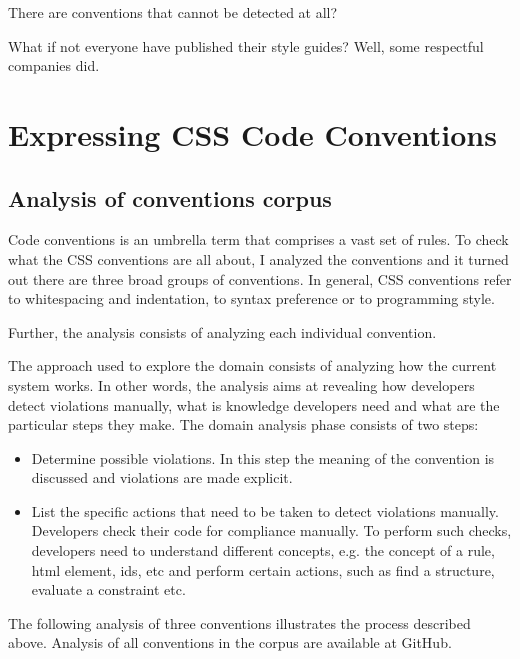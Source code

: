\documentclass[parskip=full]{uvamscse}
\begin{document}
There are conventions that cannot be detected at all?

What if not everyone have published their style guides? Well, some respectful companies did.


\chapter{Expressing CSS Code Conventions}

\section{Analysis of conventions corpus}

Code conventions is an umbrella term that comprises a vast set of rules. To check what the CSS
conventions are all about, I analyzed the conventions and it turned out there are three broad groups
of conventions. In general, CSS conventions refer to whitespacing and indentation, to syntax
preference or to programming style.

Further, the analysis consists of analyzing each individual convention.

The approach used to explore the domain consists of analyzing how the current system works. In other
words, the analysis aims at revealing how developers detect violations manually, what is knowledge
developers need and what are the particular steps they make. The domain analysis phase consists of
two steps:

  \begin{itemize}
    \item Determine possible violations. In this step the meaning of the convention is discussed and violations are made explicit.
    \item List the specific actions that need to be taken to detect violations manually. Developers check their code for compliance manually. To perform such checks, developers need to understand different concepts, e.g. the concept of a rule, html element, ids, etc and perform certain actions, such as find a structure, evaluate a constraint etc.
  \end{itemize}

The following analysis of three conventions illustrates the process described above. Analysis of all
conventions in the corpus are available at GitHub.
\end{document}
